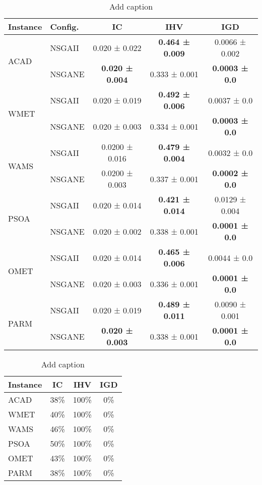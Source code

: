 \begin{table}[htbp]
  \centering
  \caption{Add caption}
    \begin{tabular}{llccc}
    \toprule
    \textbf{Instance} & \textbf{Config.} & \textbf{IC} & \textbf{IHV} & \textbf{IGD} \\
    \midrule
    \multirow{2}[2]{*}{ACAD} & NSGAII & 0.020 ± 0.022 & \textbf{0.464 ± 0.009} & 0.0066 ± 0.002 \\
          & NSGANE & \textbf{0.020 ± 0.004} & 0.333 ± 0.001 & \textbf{0.0003 ± 0.0} \\
    \multirow{2}[2]{*}{WMET} & NSGAII & 0.020 ± 0.019 & \textbf{0.492 ± 0.006} & 0.0037 ± 0.0 \\
          & NSGANE & 0.020 ± 0.003 & 0.334 ± 0.001 & \textbf{0.0003 ± 0.0} \\
    \multirow{2}[2]{*}{WAMS} & NSGAII & 0.0200 ± 0.016 & \textbf{0.479 ± 0.004} & 0.0032 ± 0.0 \\
          & NSGANE & 0.0200 ± 0.003 & 0.337 ± 0.001 & \textbf{0.0002 ± 0.0} \\
    \multirow{2}[2]{*}{PSOA} & NSGAII & 0.020 ± 0.014 & \textbf{0.421 ± 0.014} & 0.0129 ± 0.004 \\
          & NSGANE & 0.020 ± 0.002 & 0.338 ± 0.001 & \textbf{0.0001 ± 0.0} \\
    \multirow{2}[2]{*}{OMET} & NSGAII & 0.020 ± 0.014 & \textbf{0.465 ± 0.006} & 0.0044 ± 0.0 \\
          & NSGANE & 0.020 ± 0.003 & 0.336 ± 0.001 & \textbf{0.0001 ± 0.0} \\
    \multirow{2}[2]{*}{PARM} & NSGAII & 0.020 ± 0.019 & \textbf{0.489 ± 0.011} & 0.0090 ± 0.001 \\
          & NSGANE & \textbf{0.020 ± 0.003} & 0.338 ± 0.001 & \textbf{0.0001 ± 0.0} \\
    \bottomrule
    \end{tabular}%
  \label{tab:addlabel}%
\end{table}%

\begin{table}[htbp]
  \centering
  \caption{Add caption}
    \begin{tabular}{lccc}
    \toprule
    \textbf{Instance} & \textbf{IC} & \textbf{IHV} & \textbf{IGD} \\
    \midrule
    ACAD  & 38\%  & 100\% & 0\% \\
    WMET  & 40\%  & 100\% & 0\% \\
    WAMS  & 46\%  & 100\% & 0\% \\
    PSOA  & 50\%  & 100\% & 0\% \\
    OMET  & 43\%  & 100\% & 0\% \\
    PARM  & 38\%  & 100\% & 0\% \\
    \bottomrule
    \end{tabular}%
  \label{tab:addlabel}%
\end{table}%


